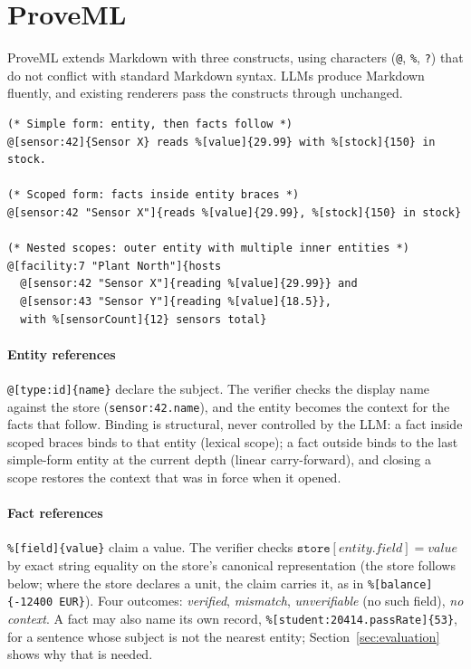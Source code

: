 \documentclass[11pt,a4paper]{article}
\begin{document}
\section{ProveML}
\label{sec:proveml}

ProveML extends Markdown with three constructs, using characters (\texttt{@}, \texttt{\%}, \texttt{?}) that do not conflict with standard Markdown syntax. LLMs produce Markdown fluently, and existing renderers pass the constructs through unchanged.

\begin{lstlisting}
(* Simple form: entity, then facts follow *)
@[sensor:42]{Sensor X} reads %[value]{29.99} with %[stock]{150} in stock.

(* Scoped form: facts inside entity braces *)
@[sensor:42 "Sensor X"]{reads %[value]{29.99}, %[stock]{150} in stock}

(* Nested scopes: outer entity with multiple inner entities *)
@[facility:7 "Plant North"]{hosts
  @[sensor:42 "Sensor X"]{reading %[value]{29.99}} and
  @[sensor:43 "Sensor Y"]{reading %[value]{18.5}},
  with %[sensorCount]{12} sensors total}
\end{lstlisting}

\paragraph{Entity references} \texttt{@[type:id]\{name\}} declare the subject. The verifier checks the display name against the store (\texttt{sensor:42.name}), and the entity becomes the context for the facts that follow. Binding is structural, never controlled by the LLM: a fact inside scoped braces binds to that entity (lexical scope); a fact outside binds to the last simple-form entity at the current depth (linear carry-forward), and closing a scope restores the context that was in force when it opened.

\paragraph{Fact references} \texttt{\%[field]\{value\}} claim a value. The verifier checks $\texttt{store}[\textit{entity}.\textit{field}] = \textit{value}$ by exact string equality on the store's canonical representation (the store follows below; where the store declares a unit, the claim carries it, as in \texttt{\%[balance]\{-12400 EUR\}}). Four outcomes: \textit{verified}, \textit{mismatch}, \textit{unverifiable} (no such field), \textit{no context}. A fact may also name its own record, \texttt{\%[student:20414.passRate]\{53\}}, for a sentence whose subject is not the nearest entity; Section~\ref{sec:evaluation} shows why that is needed.
\end{document}
